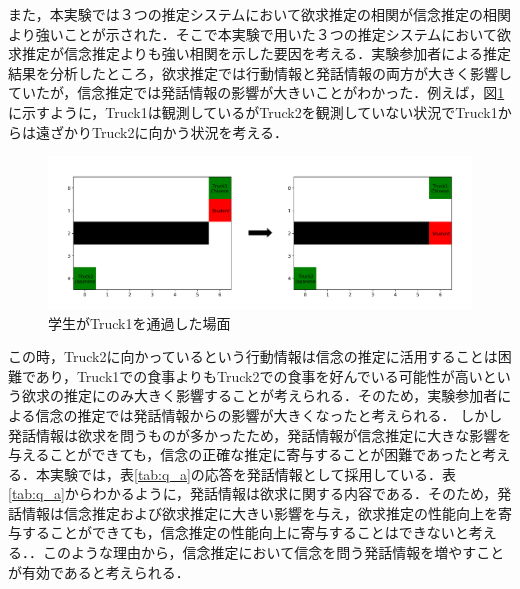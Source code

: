 \par
また，本実験では３つの推定システムにおいて欲求推定の相関が信念推定の相関より強いことが示された．そこで本実験で用いた３つの推定システムにおいて欲求推定が信念推定よりも強い相関を示した要因を考える．実験参加者による推定結果を分析したところ，欲求推定では行動情報と発話情報の両方が大きく影響していたが，信念推定では発話情報の影響が大きいことがわかった．例えば，図\ref{fig:ex_env3}に示すように，Truck1は観測しているがTruck2を観測していない状況でTruck1からは遠ざかりTruck2に向かう状況を考える．
\begin{figure}[htbp]
  \begin{center}
    \includegraphics[scale=0.48]{./ex_env3.pdf}
    \caption{学生がTruck1を通過した場面}
    \label{fig:ex_env3}
  \end{center}
\end{figure}
この時，Truck2に向かっているという行動情報は信念の推定に活用することは困難であり，Truck1での食事よりもTruck2での食事を好んでいる可能性が高いという欲求の推定にのみ大きく影響することが考えられる．そのため，実験参加者による信念の推定では発話情報からの影響が大きくなったと考えられる．
しかし発話情報は欲求を問うものが多かったため，発話情報が信念推定に大きな影響を与えることができても，信念の正確な推定に寄与することが困難であったと考える．本実験では，表\ref{tab:q_a}の応答を発話情報として採用している．表\ref{tab:q_a}からわかるように，発話情報は欲求に関する内容である．そのため，発話情報は信念推定および欲求推定に大きい影響を与え，欲求推定の性能向上を寄与することができても，信念推定の性能向上に寄与することはできないと考える．．このような理由から，信念推定において信念を問う発話情報を増やすことが有効であると考えられる．
